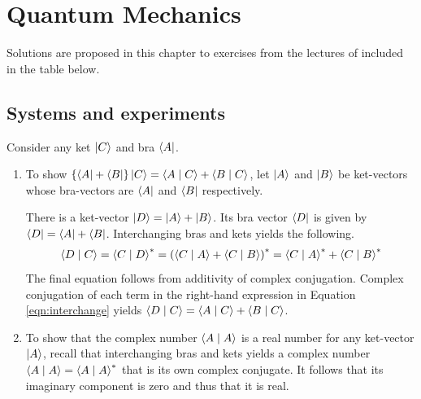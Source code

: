 

\chapter{Quantum Mechanics}\label{chap:quantum}

Solutions are proposed in this chapter to exercises from the lectures of \cite{QM} included in the table below.

\localtableofcontents

\section{Systems and experiments}

\begin{answer}
	Consider any ket $\ket{C}$ and bra $\bra{A}$.
	\begin{enumerate}
		\item To show $\left\{\bra{A} + \bra{B}\right\} \ket{C} = \braket{A \mid C} + \braket{B \mid C}$, let $\ket{A}$ and $\ket{B}$ be ket-vectors whose bra-vectors are $\bra{A}$ and $\bra{B}$ respectively.

		      There is a ket-vector $\ket{D} = \ket{A} + \ket{B}$.
		      Its bra vector $\bra{D}$ is given by $\bra{D} = \bra{A} + \bra{B}$.
		      Interchanging bras and kets yields the following.
		      \begin{align}\label{eqn:interchange}
			      \braket{D \mid C} = \braket{C \mid D}^* = \left(\braket{C \mid A} + \braket{C \mid B}\right)^* = \braket{C \mid A}^* + \braket{C \mid B}^*
		      \end{align}
		      The final equation follows from additivity of complex conjugation.
		      Complex conjugation of each term in the right-hand expression in Equation \eqref{eqn:interchange} yields $\braket{D \mid C} = \braket{A \mid C} + \braket{B \mid C}$.
		\item To show that the complex number $\braket{A \mid A}$ is a real number for any ket-vector $\ket{A}$, recall that interchanging bras and kets yields a complex number $\braket{A \mid A} = \braket{A \mid A}^*$ that is its own complex conjugate.
		      It follows that its imaginary component is zero and thus that it is real.
	\end{enumerate}
\end{answer}

